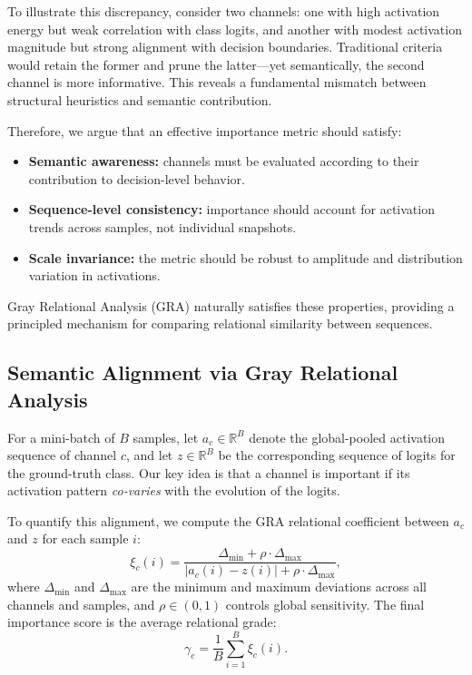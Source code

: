 \documentclass[sn-mathphys,Numbered]{sn-jnl}
\begin{document}
To illustrate this discrepancy, consider two channels: one with high activation energy but weak correlation with class logits, and another with modest activation magnitude but strong alignment with decision boundaries. Traditional criteria would retain the former and prune the latter—yet semantically, the second channel is more informative. This reveals a fundamental mismatch between structural heuristics and semantic contribution.

Therefore, we argue that an effective importance metric should satisfy:
\begin{itemize}
    \item \textbf{Semantic awareness:} channels must be evaluated according to their contribution to decision-level behavior.
    \item \textbf{Sequence-level consistency:} importance should account for activation trends across samples, not individual snapshots.
    \item \textbf{Scale invariance:} the metric should be robust to amplitude and distribution variation in activations.
\end{itemize}

Gray Relational Analysis (GRA) naturally satisfies these properties, providing a principled mechanism for comparing relational similarity between sequences.

\subsection{Semantic Alignment via Gray Relational Analysis}

For a mini-batch of $B$ samples, let $a_{c} \in \mathbb{R}^{B}$ denote the global-pooled activation sequence of channel $c$, and let $z \in \mathbb{R}^{B}$ be the corresponding sequence of logits for the ground-truth class. Our key idea is that a channel is important if its activation pattern \emph{co-varies} with the evolution of the logits.

To quantify this alignment, we compute the GRA relational coefficient between $a_{c}$ and $z$ for each sample $i$:
\begin{equation}
\xi_{c}(i) = \frac{\Delta_{\min} + \rho \cdot \Delta_{\max}}{\left|a_{c}(i) - z(i)\right| + \rho \cdot \Delta_{\max}},
\end{equation}
where $\Delta_{\min}$ and $\Delta_{\max}$ are the minimum and maximum deviations across all channels and samples, and $\rho \in (0,1)$ controls global sensitivity. The final importance score is the average relational grade:
\begin{equation}
\gamma_{c} = \frac{1}{B} \sum_{i=1}^{B} \xi_{c}(i).
\label{eq:gra_score}
\end{equation}
\end{document}
